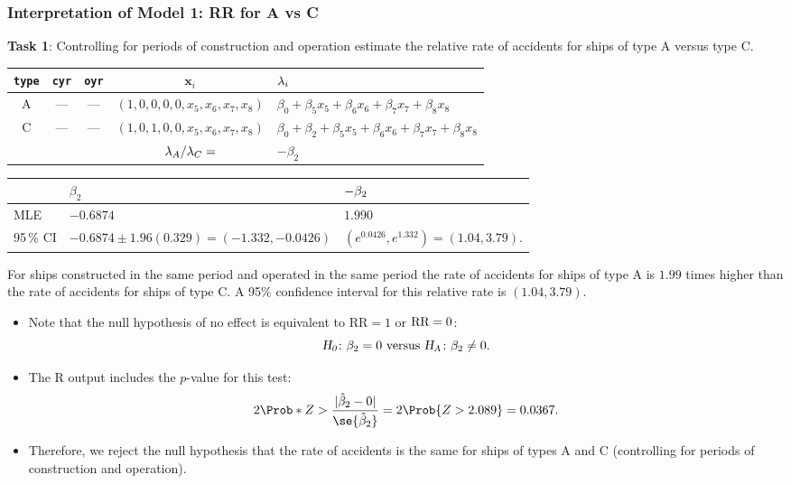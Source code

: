 \documentclass[oneside]{book}\usepackage[]{graphicx}\usepackage[svgnames]{xcolor}
\let\exp\relax%
\let\log\relax%
\newcommand{\HN}{\textsl{H}_{\textsl{0}}}%
\newcommand{\HA}{\textsl{H}_{\textsl{A}}}%
\newcommand{\RR}{\text{RR}}%
\DeclarePairedDelimiter\abs{\lvert}{\rvert}
\providecommand{\Vector}[1]{\bm{#1}}%
\begin{document}
\subsubsection*{Interpretation of Model 1: RR for A vs C}
\begin{Example}{}
      \textbf{Task 1}: Controlling for periods of construction and operation estimate the relative rate of
      accidents for ships of type A versus type C.
\end{Example}
\begin{table}[H]
      \centering
      \begin{tabular}{ccccl}
            \texttt{type} & \texttt{cyr} & \texttt{oyr} & $ \Vector{x}_i $                & $ \log{\lambda_i} $                                             \\
            \midrule
            A             & ---          & ---          & $ (1,0,0,0,0,x_5,x_6,x_7,x_8) $ & $ \beta_0+\beta_5x_5+\beta_6x_6+\beta_7x_7+\beta_8x_8 $         \\
            C             & ---          & ---          & $ (1,0,1,0,0,x_5,x_6,x_7,x_8) $ & $ \beta_0+\beta_2+\beta_5x_5+\beta_6x_6+\beta_7x_7+\beta_8x_8 $ \\
            \midrule
                          &              &              & $ \log{\lambda_A/\lambda_C}= $  & $ -\beta_2 $
      \end{tabular}
\end{table}
\begin{table}[H]
      \centering
      \begin{tabular}{lll}
                      & $ \beta_2 $                                 & $ \exp{-\beta_2} $                      \\
            \midrule
            MLE       & $ -0.6874 $                                 & $ 1.990 $                               \\
            95\,\% CI & $ -0.6874\pm 1.96(0.329)=(-1.332,-0.0426) $ & $ (e^{0.0426},e^{1.332})=(1.04,3.79) $.
      \end{tabular}
\end{table}
For ships constructed in the same period and operated in the same period the rate of
accidents for ships of type A is $1.99$ times higher than the rate of accidents for ships of
type C. A 95\% confidence interval for this relative rate is $(1.04, 3.79)$.
\begin{itemize}
      \item Note that the null hypothesis of no effect is equivalent to $ \RR=1 $ or $ \log{\RR}=0 $:
            \[ \HN\colon \beta_2=0\text{ versus }\HA\colon \beta_2\ne 0. \]
      \item The R output includes the $ p $-value for this test:
            \[ 2\Prob*{Z>\frac{\abs{\hat{\beta}_2-0}}{\se{\hat{\beta}_2}}}=2\Prob{Z>2.089}=0.0367. \]
      \item Therefore, we reject the null hypothesis that the rate of accidents is the same for
            ships of types A and C (controlling for periods of construction and operation).
\end{itemize}
\end{document}

